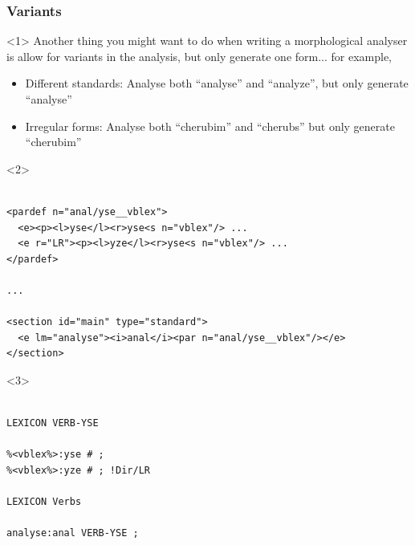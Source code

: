 \documentclass[10pt,xetex]{beamer} %
\begin{document}
%
%
%
%
%

\begin{frame}[fragile]
  \frametitle{Variants}

\begin{onlyenv}<1>
Another thing you might want to do when writing a morphological analyser is allow
for variants in the analysis, but only generate one form... for example,

\begin{itemize}
  \item Different standards: Analyse both ``analyse'' and ``analyze'', but only generate ``analyse''
  \item Irregular forms: Analyse both ``cherubim'' and ``cherubs'' but only generate ``cherubim''
\end{itemize}

\end{onlyenv}


\begin{onlyenv}<2>
\begin{verbatim}

<pardef n="anal/yse__vblex">
  <e><p><l>yse</l><r>yse<s n="vblex"/> ...
  <e r="LR"><p><l>yze</l><r>yse<s n="vblex"/> ...
</pardef>

...

<section id="main" type="standard">
  <e lm="analyse"><i>anal</i><par n="anal/yse__vblex"/></e>
</section>

\end{verbatim}
\end{onlyenv}

\begin{onlyenv}<3>
\begin{verbatim}

LEXICON VERB-YSE

%<vblex%>:yse # ;
%<vblex%>:yze # ; !Dir/LR

LEXICON Verbs

analyse:anal VERB-YSE ;

\end{verbatim}
\end{onlyenv}


\end{frame}
\end{document}

